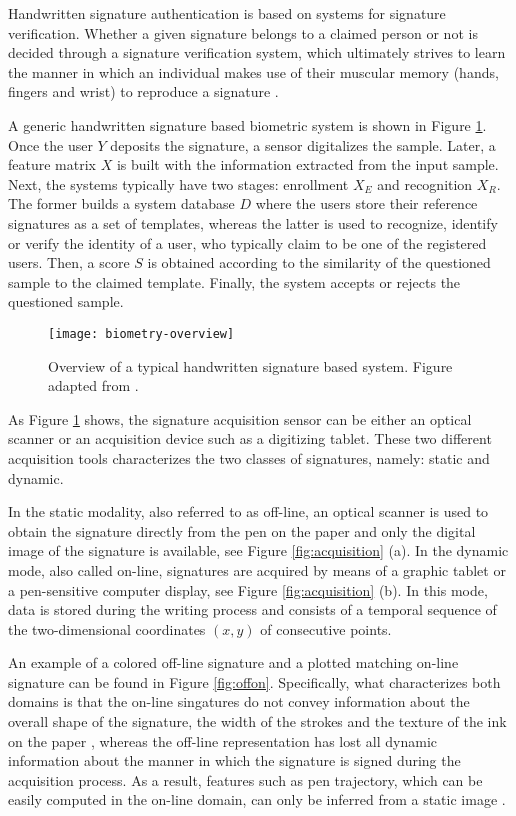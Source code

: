 Handwritten signature authentication is based on systems for signature verification. 
Whether a given signature belongs to a claimed person or not is decided through a signature verification system, which ultimately strives to learn the manner in which
an individual makes use of their muscular memory (hands,
fingers and wrist) to reproduce a signature \cite{gupta1997review}. 

A generic handwritten signature based biometric system is shown in Figure \ref{fig_ahsv-overview}. Once the user {\boldm $Y$} deposits the signature, a sensor digitalizes the sample. Later, a feature matrix {\boldm $X$} is built with the information extracted from the input sample. Next, the systems typically have two stages: enrollment {\boldm $X_{E}$} and recognition {\boldm $X_{R}$}. The former builds a system database {\boldm $D$} where the users store their reference signatures as a set of templates, whereas the latter is
used to recognize, identify or verify the identity of a user, who typically claim to be one of the registered users. Then, a score {\boldm $S$} is obtained according to the similarity of the
questioned sample to the claimed template. Finally, the system accepts or rejects the questioned sample.

\begin{figure}[!htb]
\centering
\texttt{[image: biometry-overview]}
\caption{Overview of a typical handwritten signature based system. Figure adapted from \cite{jain2016}.}
\label{fig_ahsv-overview}
\end{figure}

As Figure \ref{fig_ahsv-overview} shows, the signature acquisition sensor can be either an optical scanner or an acquisition device such as a digitizing tablet. These two different acquisition tools characterizes the two classes of signatures, namely: static and dynamic. 

In the static modality, also referred to as off-line, an optical scanner is used to obtain the signature directly from the pen on the paper and only the digital image of the signature is available, see Figure \ref{fig:acquisition} (a). In the dynamic mode, also called on-line, signatures are acquired by means of a graphic tablet or a pen-sensitive computer display, see Figure \ref{fig:acquisition} (b). In this mode, data is stored during the writing process and consists of a temporal sequence of the two-dimensional coordinates $(x, y)$ of consecutive points. 

An example of a colored off-line signature and a plotted matching on-line signature can be found in Figure \ref{fig:offon}. Specifically, what characterizes both domains is that the on-line singatures do not convey information about the overall shape of the signature, the width of the strokes and the texture of the ink on the paper \cite{diaz2014generation}, whereas the off-line representation has lost all dynamic information about the manner in which
the signature is signed during the acquisition process. As a result, features such as pen trajectory, which can be easily computed in the on-line domain, can only be inferred from a static image \cite{nel2005estimating}.


